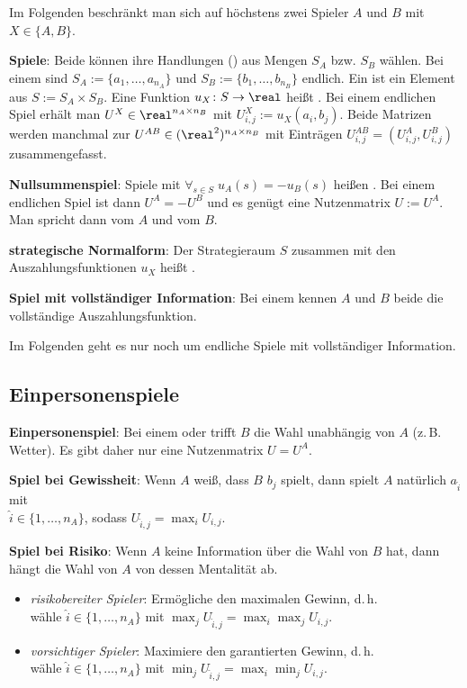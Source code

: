 Im Folgenden beschränkt man sich auf höchstens zwei Spieler $A$ und $B$
mit $X \in \{A, B\}$.

\textbf{Spiele}:
Beide können ihre Handlungen () aus Mengen $S_A$ bzw. $S_B$ wählen.
Bei einem  sind $S_A := \{a_1, \dotsc, a_{n_A}\}$ und
$S_B := \{b_1, \dotsc, b_{n_B}\}$ endlich.
Ein  ist ein Element aus $S := S_A \times S_B$.
Eine Funktion $u_X\colon S \to \real$ heißt .
Bei einem endlichen Spiel erhält man 
$U^X \in \real^{n_A \times n_B}$ mit
$U_{i,j}^X := u_X(a_i, b_j)$.
Beide Matrizen werden manchmal zur 
$U^{AB} \in (\real^2)^{n_A \times n_B}$ mit Einträgen $U_{i,j}^{AB} = (U_{i,j}^A, U_{i,j}^B)$
zusammengefasst.

\textbf{Nullsummenspiel}:
Spiele mit $\forall_{s \in S}\; u_A(s) = -u_B(s)$ heißen .
Bei einem endlichen Spiel ist dann $U^A = -U^B$ und es genügt eine Nutzenmatrix $U := U^A$.
Man spricht dann vom  $A$ und vom  $B$.

\textbf{strategische Normalform}:
Der Strategieraum $S$ zusammen mit den Auszahlungsfunktionen $u_X$ heißt
.

\textbf{Spiel mit vollständiger Information}:
Bei einem  kennen $A$ und $B$ beide die
vollständige Auszahlungsfunktion.

Im Folgenden geht es nur noch um endliche Spiele mit vollständiger Information.

\pagebreak

\subsection{%
    Einpersonenspiele%
}

\textbf{Einpersonenspiel}:
Bei einem  oder  trifft
$B$ die Wahl unabhängig von $A$ (z.\,B. Wetter).
Es gibt daher nur eine Nutzenmatrix $U = U^A$.

\textbf{Spiel bei Gewissheit}:
Wenn $A$ weiß, dass $B$ $b_j$ spielt, dann spielt $A$ natürlich $a_{\widehat{i}}$ mit\\
$\widehat{i} \in \{1, \dotsc, n_A\}$, sodass $U_{\widehat{i},j} = \max_i U_{i,j}$.

\textbf{Spiel bei Risiko}:
Wenn $A$ keine Information über die Wahl von $B$ hat, dann hängt die Wahl von $A$ von dessen
Mentalität ab.
\begin{itemize}
    \item
    \emph{risikobereiter Spieler}:
    Ermögliche den maximalen Gewinn, d.\,h.\\
    wähle $\widehat{i} \in \{1, \dotsc, n_A\}$
    mit $\max_j U_{\widehat{i},j} = \max_i \max_j U_{i,j}$.
    
    \item
    \emph{vorsichtiger Spieler}:
    Maximiere den garantierten Gewinn, d.\,h.\\
    wähle $\widehat{i} \in \{1, \dotsc, n_A\}$
    mit $\min_j U_{\widehat{i},j} = \max_i \min_j U_{i,j}$.
\end{itemize}

